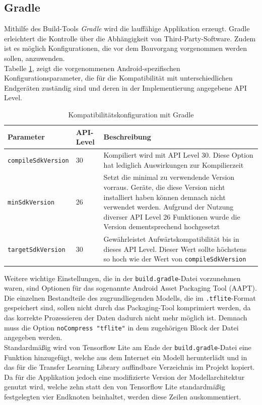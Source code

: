 \documentclass[oneside]{ausarbeitung}
\begin{document}
\subsection{Gradle}
Mithilfe des Build-Tools \textit{Gradle} wird die lauffähige Applikation erzeugt. Gradle erleichtert die Kontrolle über die Abhängigkeit von Third-Party-Software. Zudem ist es möglich Konfigurationen, die vor dem Bauvorgang vorgenommen werden sollen, anzuwenden.\\
Tabelle \ref{tab:gradle-config}, zeigt die vorgenommenen Android-spezifischen Konfigurationsparameter, die für die Kompatibilität mit unterschiedlichen Endgeräten zuständig sind und deren in der Implementierung angegebene API Level.\\
\begin{table}[htbp]
	\centering
	\begin{tabular}{|l|p{1cm}|p{8.5cm}|}
		\hline
		\textbf{Parameter} & \textbf{API-Level} & \textbf{Beschreibung} \\ \hline
		\texttt{compileSdkVersion} & 30 & Kompiliert wird mit API Level 30. Diese Option hat lediglich Auswirkungen zur Kompilierzeit  \\ \hline
		\texttt{minSdkVersion} & 26 & Setzt die minimal zu verwendende Version vorraus. Geräte, die diese Version nicht installiert haben können demnach nicht verwendet werden. Aufgrund der Nutzung diverser API Level 26 Funktionen wurde die Version dementsprechend hochgesetzt \\ \hline
		\texttt{targetSdkVersion} & 30 & Gewährleistet Aufwärtskompatibilität bis in dieses API Level. Dieser Wert sollte höchstens so hoch wie der Wert von \texttt{compileSdkVersion}  \\ \hline
	\end{tabular}
	\caption{Kompatibilitätskonfiguration mit Gradle}
	\label{tab:gradle-config}
\end{table}Weitere wichtige Einstellungen, die in der \texttt{build.gradle}-Datei vorzunehmen waren, sind Optionen für das sogenannte Android Asset Packaging Tool (AAPT). Die einzelnen Bestandteile des zugrundliegenden Modells, die im \texttt{.tflite}-Format gespeichert sind, sollen nicht durch das Packaging-Tool komprimiert werden, da das korrekte Prozessieren der Daten dadurch nicht mehr möglich ist. Demnach muss die Option \texttt{noCompress "tflite"} in dem zugehörigen Block der Datei angegeben werden.\\ 
Standardmäßig wird von Tensorflow Lite am Ende der \texttt{build.gradle}-Datei eine Funktion hinzugefügt, welche aus dem Internet ein Modell herunterlädt und in das für die Transfer Learning Library auffindbare Verzeichnis im Projekt kopiert.\\
Da für die Applikation jedoch eine modifizierte Version der Modellarchitektur genutzt wird, welche zehn statt den von Tensorflow Lite standardmäßig festgelegten vier Endknoten beinhaltet, werden diese Zeilen auskommentiert.
\end{document}
